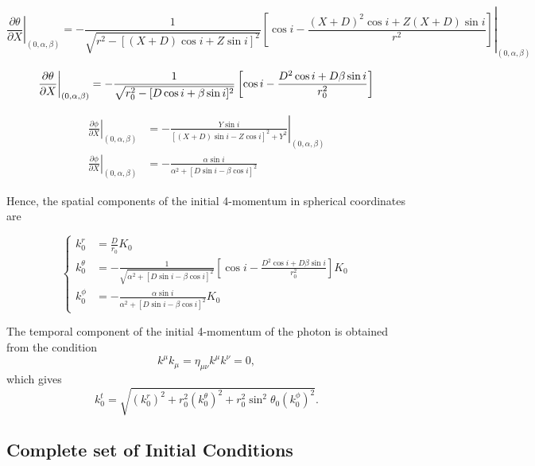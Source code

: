 \footnotesize
\begin{equation}
\left. \frac{\partial \theta}{\partial X} \right|_{(0,\alpha,\beta)} = \left.-\frac{1}{\sqrt{r^2-[(X+D)\cos i + Z \sin i]^2}}  \left[ \cos i - \frac{(X+D)^2 \cos i + Z(X+D) \sin i}{r^2}\right]\right|_{(0,\alpha,\beta)} \nonumber
\end{equation}
\normalsize

\begin{equation}
\left. \frac{\partial \theta}{\partial X} \right|_{(0,\alpha,\beta)} = -\frac{1}{\sqrt{r^2_0 -[D\cos i + \beta \sin i]^2}}  \left[ \cos i - \frac{D^2 \cos i + D\beta \sin i}{r^2_0}\right]\\
\end{equation}

\begin{align}
\left. \frac{\partial \phi}{\partial X} \right|_{(0,\alpha,\beta)} &= \left.-\frac{Y \sin i}{[(X+D)\sin i - Z \cos i ]^2 + Y^2 } \right|_{(0,\alpha,\beta)} \nonumber \\
\left. \frac{\partial \phi}{\partial X} \right|_{(0,\alpha,\beta)} &= -\frac{\alpha \sin i}{\alpha^2 +[D \sin i - \beta \cos i]^2 }  
\end{align}

Hence, the spatial components of the initial 4-momentum in spherical coordinates are

\begin{equation}
\begin{cases}
k^r_0 &= \frac{D}{r_0} K_0\\
k^\theta _0 &= -\frac{1}{\sqrt{\alpha^2 +[D\sin i - \beta \cos i]^2}}  \left[ \cos i - \frac{D^2 \cos i + D\beta \sin i}{r^2_0}\right] K_0 \\
k^\phi _0 &= -\frac{\alpha \sin i}{\alpha^2 +[D \sin i - \beta \cos i]^2 } K_0
\end{cases} \label{initialSpatialMomentum}
\end{equation}

The temporal component of the initial 4-momentum of the photon is obtained from the condition 
\begin{equation}
k^\mu k_\mu =  \eta_{\mu \nu} k^\mu k^\nu = 0,
\end{equation}
which gives
\begin{equation}
k^t_0 = \sqrt{(k^r_0)^2 + r_0^2 (k^\theta _0)^2 + r_0^2 \sin^2 \theta_0 (k^\phi _0)^2}. \label{initialTempMomentum}
\end{equation}


\subsection{Complete set of Initial Conditions}

